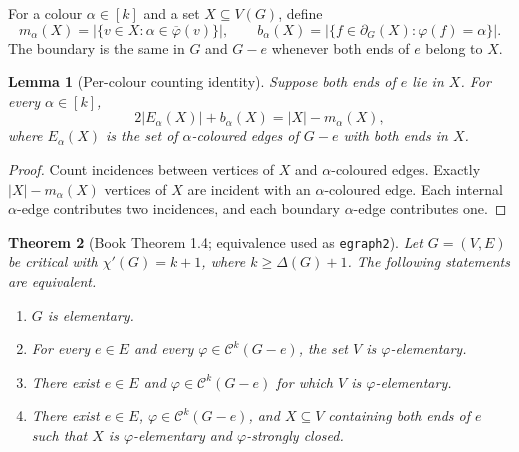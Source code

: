 \documentclass[11pt]{article}
\newtheorem{theorem}{Theorem}[section]
\newtheorem{lemma}[theorem]{Lemma}
\theoremstyle{definition}
\newcommand{\calC}{\mathcal C}
\newcommand{\abs}[1]{\lvert #1\rvert}
\newcommand{\missing}[1]{\overline{#1}}
\newcommand{\boundary}{\partial}
\begin{document}
For a colour $\alpha\in[k]$ and a set $X\subseteq V(G)$, define
\[
  m_\alpha(X)=\abs{\{v\in X:\alpha\in\missing\varphi(v)\}},
  \qquad
  b_\alpha(X)=\abs{\{f\in\boundary_G(X):\varphi(f)=\alpha\}}.
\]
The boundary is the same in $G$ and $G-e$ whenever both ends of $e$ belong to
$X$.

\begin{lemma}[Per-colour counting identity]\label{lem:per-colour-count}
Suppose both ends of $e$ lie in $X$.  For every $\alpha\in[k]$,
\[
  2\abs{E_\alpha(X)}+b_\alpha(X)=\abs X-m_\alpha(X),
  \tag{3.1}\label{eq:per-colour}
\]
where $E_\alpha(X)$ is the set of $\alpha$-coloured edges of $G-e$ with both
ends in $X$.
\end{lemma}

\begin{proof}
Count incidences between vertices of $X$ and $\alpha$-coloured edges.  Exactly
$\abs X-m_\alpha(X)$ vertices of $X$ are incident with an $\alpha$-coloured
edge.  Each internal $\alpha$-edge contributes two incidences, and each
boundary $\alpha$-edge contributes one.
\end{proof}

\begin{theorem}[Book Theorem 1.4; equivalence used as \texttt{egraph2}]
\label{thm:egraph2}\label{egraph2}
Let $G=(V,E)$ be critical with $\chi'(G)=k+1$, where
$k\ge\Delta(G)+1$.  The following statements are equivalent.
\begin{enumerate}
  \item\label{item:egraph-elementary} $G$ is elementary.
  \item\label{item:egraph-every} For every $e\in E$ and every
  $\varphi\in\calC^k(G-e)$, the set $V$ is $\varphi$-elementary.
  \item\label{item:egraph-some} There exist $e\in E$ and
  $\varphi\in\calC^k(G-e)$ for which $V$ is $\varphi$-elementary.
  \item\label{item:egraph-closed} There exist $e\in E$,
  $\varphi\in\calC^k(G-e)$, and $X\subseteq V$ containing both ends of $e$
  such that $X$ is $\varphi$-elementary and $\varphi$-strongly closed.
\end{enumerate}
\end{theorem}
\end{document}
